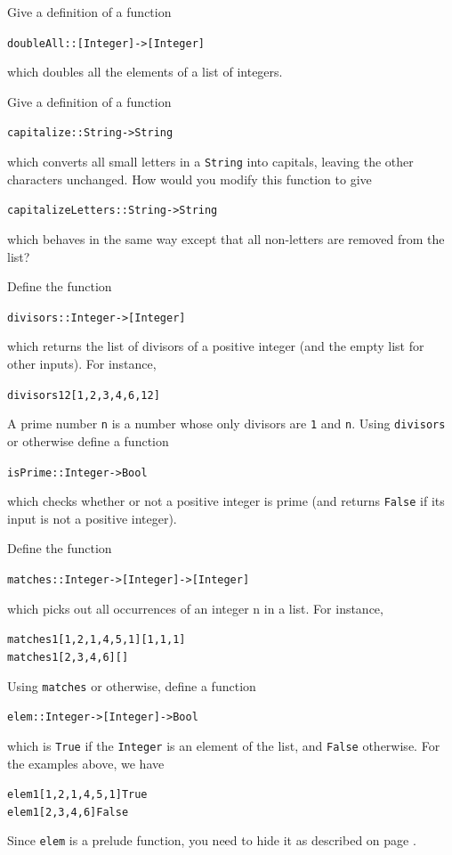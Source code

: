 \begin{exercises}

\item
Give a definition of a function
\begin{alltt}
doubleAll :: [Integer] -> [Integer]
\end{alltt}
which doubles all the elements of a list of integers.

\item
Give a definition of a function
\begin{alltt}
capitalize :: String -> String
\end{alltt}
which converts all small letters in a \texttt{String}
into capitals, leaving the other characters unchanged. How would you
modify this function to give
\begin{alltt}
capitalizeLetters :: String -> String
\end{alltt}
which behaves in the same way except that all non-letters are
removed from the list? 

\item
Define the function
\begin{alltt}
divisors :: Integer -> [Integer]
\end{alltt}
which returns the list of divisors of a positive integer (and the empty
list for other inputs). For instance,
\begin{alltt}
divisors 12 \step{}[1,2,3,4,6,12]
\end{alltt}
A prime number \texttt{n} is a number whose only divisors are
\texttt{1} and \texttt{n}. Using \texttt{divisors}
or otherwise define a function
\begin{alltt}
isPrime :: Integer -> Bool
\end{alltt}
which checks whether or not a positive integer is prime (and returns
\texttt{False} if its input is not a positive integer).

\item
Define the function
\begin{alltt}
matches :: Integer -> [Integer] -> [Integer]
\end{alltt}
which picks out all occurrences of an integer n in a list. For instance,
\begin{alltt}
matches 1 [1,2,1,4,5,1] \step{}[1,1,1]
matches 1 [2,3,4,6]     \step{}[]
\end{alltt}
Using \texttt{matches} or otherwise, define a function
\begin{alltt}
elem :: Integer -> [Integer] -> Bool
\end{alltt}
which is \texttt{True}
if the \texttt{Integer} is an element of the list, and \texttt{False}
otherwise. For the examples above, we have
\begin{alltt}
elem 1 [1,2,1,4,5,1] \step{}True
elem 1 [2,3,4,6]     \step{}False
\end{alltt}
Since \texttt{elem} is a prelude function, you need to hide it as
described on page \pageref{redefName}.



\end{exercises}
